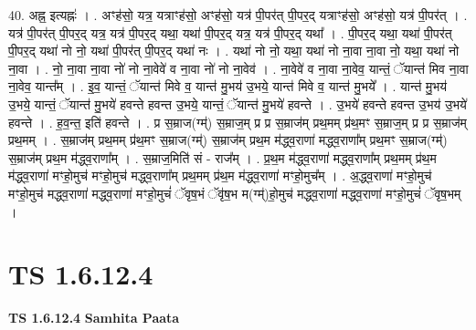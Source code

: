 \documentclass[17pt]{extarticle}
\begin{document}
40. अह्न॒ इत्यह्नः॑ । . अꣳह॑सो॒ यत्र॒ यत्राꣳह॑सो॒ अꣳह॑सो॒ यत्र॑ पी॒पर॑त् पी॒पर॒द् यत्राꣳह॑सो॒ अꣳह॑सो॒ यत्र॑ पी॒पर॑त् । . यत्र॑ पी॒पर॑त् पी॒पर॒द् यत्र॒ यत्र॑ पी॒पर॒द् यथा॒ यथा॑ पी॒पर॒द् यत्र॒ यत्र॑ पी॒पर॒द् यथा᳚ । . पी॒पर॒द् यथा॒ यथा॑ पी॒पर॑त् पी॒पर॒द् यथा॑ नो नो॒ यथा॑ पी॒पर॑त् पी॒पर॒द् यथा॑ नः । . यथा॑ नो नो॒ यथा॒ यथा॑ नो ना॒वा ना॒वा नो॒ यथा॒ यथा॑ नो ना॒वा । . नो॒ ना॒वा ना॒वा नो॑ नो ना॒वेवे॑ व ना॒वा नो॑ नो ना॒वेव॑ । . ना॒वेवे॑ व ना॒वा ना॒वेव॒ यान्तं॒ ॅयान्त॑ मिव ना॒वा ना॒वेव॒ यान्त᳚म् । . इ॒व॒ यान्तं॒ ॅयान्त॑ मिवे व॒ यान्त॑ मु॒भय॑ उ॒भये॒ यान्त॑ मिवे व॒ यान्त॑ मु॒भये᳚ । . यान्त॑ मु॒भय॑ उ॒भये॒ यान्तं॒ ॅयान्त॑ मु॒भये॑ हवन्ते हवन्त उ॒भये॒ यान्तं॒ ॅयान्त॑ मु॒भये॑ हवन्ते । . उ॒भये॑ हवन्ते हवन्त उ॒भय॑ उ॒भये॑ हवन्ते । . ह॒व॒न्त॒ इति॑ हवन्ते । . प्र स॒म्राज(ग्म्॑) स॒म्राज॒म् प्र प्र स॒म्राज॑म् प्रथ॒मम् प्र॑थ॒मꣳ स॒म्राज॒म् प्र प्र स॒म्राज॑म् प्रथ॒मम् । . स॒म्राज॑म् प्रथ॒मम् प्र॑थ॒मꣳ स॒म्राज(ग्म्॑) स॒म्राज॑म् प्रथ॒म म॑द्ध्व॒राणा॑ मद्ध्व॒राणा᳚म् प्रथ॒मꣳ स॒म्राज(ग्म्॑) स॒म्राज॑म् प्रथ॒म म॑द्ध्व॒राणा᳚म् । . स॒म्राज॒मिति॑ सं - राज᳚म् । . प्र॒थ॒म म॑द्ध्व॒राणा॑ मद्ध्व॒राणा᳚म् प्रथ॒मम् प्र॑थ॒म म॑द्ध्व॒राणा॑ मꣳहो॒मुच॑ मꣳहो॒मुच॑ मद्ध्व॒राणा᳚म् प्रथ॒मम् प्र॑थ॒म म॑द्ध्व॒राणा॑ मꣳहो॒मुच᳚म् । . अ॒द्ध्व॒राणा॑ मꣳहो॒मुच॑ मꣳहो॒मुच॑ मद्ध्व॒राणा॑ मद्ध्व॒राणा॑ मꣳहो॒मुचं॑ ॅवृष॒भं ॅवृ॑ष॒भ म(ग्म्॑)हो॒मुच॑ मद्ध्व॒राणा॑ मद्ध्व॒राणा॑ मꣳहो॒मुचं॑ ॅवृष॒भम् । \newline
\pagebreak
{}

\section{ TS 1.6.12.4 }

\textbf{TS 1.6.12.4 } \newline
\textbf{Samhita Paata} \newline
\end{document}
